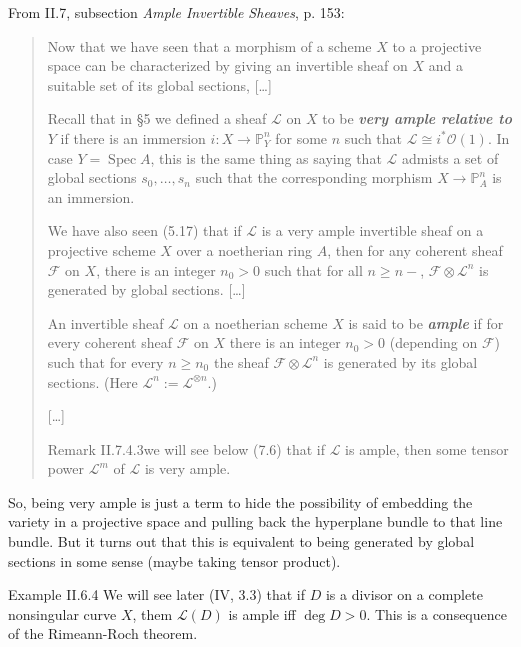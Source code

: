 From II.7, subsection \textit{Ample Invertible Sheaves}, p. 153:
\begin{quotation}
	Now that we have seen that a morphism of a scheme \(X\) to a projective space can be characterized by giving an invertible sheaf on \(X\) and a suitable set of its global sections, […]

	Recall that in §5 we defined a sheaf \(\mathcal{L}\) on \(X\) to be \textit{\textbf{very ample relative to \(Y\)}} if there is an immersion \(i: X \to \mathbb{P}^n_Y\) for some \(n\) such that \(\mathcal{L} \cong i^*\mathcal{O}(1)\). In case \(Y = \operatorname{Spec}A\), this is the same thing as saying that \(\mathcal{L}\) admists a set of global sections \(s_0,\ldots,s_n\) such that the corresponding morphism \(X \to \mathbb{P}^n_A\) is an immersion.

	We have also seen (5.17) that if \(\mathcal{L}\) is a very ample invertible sheaf on a projective scheme \(X\) over a noetherian ring \(A\), then for any coherent sheaf \(\mathcal{F}\) on \(X\), there is an integer \(n_0>0\) such that for all \(n \geq  n-\), \(\mathcal{F} \otimes \mathcal{L}^n\) is generated by global sections. […]
	\begin{defn}\leavevmode
	An invertible sheaf \(\mathcal{L}\) on a noetherian scheme \(X\) is said to be \textit{\textbf{ample}} if for every coherent sheaf  \(\mathcal{F}\) on \(X\) there is an integer \(n_0>0\) (depending on \(\mathcal{F}\)) such that for every \(n \geq  n_0\) the sheaf \(\mathcal{F} \otimes \mathcal{L}^n\) is generated by its global sections. (Here \(\mathcal{L}^n:= \mathcal{L}^{\otimes n}\).)
	\end{defn}
	[…]
	\begin{thing5}{Remark II.7.4.3}\label{rk:II.7.4.3}\leavevmode
		[…] we will see below (7.6) that if \(\mathcal{L}\) is ample, then some tensor power  \(\mathcal{L}^m\) of \(\mathcal{L}\) is very ample.
	\end{thing5}
\end{quotation}

So, being very ample is just a term to hide the possibility of embedding the variety in a projective space and pulling back the hyperplane bundle to that line bundle. But it turns out that this is equivalent to being generated by global sections in some sense (maybe taking tensor product).

\begin{thing4}{Example II.6.4}\label{exer:}\leavevmode
	We will see later (IV, 3.3) that if  \(D\) is a divisor on a complete nonsingular curve \(X\), them \(\mathcal{L}(D)\) is ample iff \(\operatorname{deg}D>0\). This is a consequence of the Rimeann-Roch theorem.
\end{thing4}

